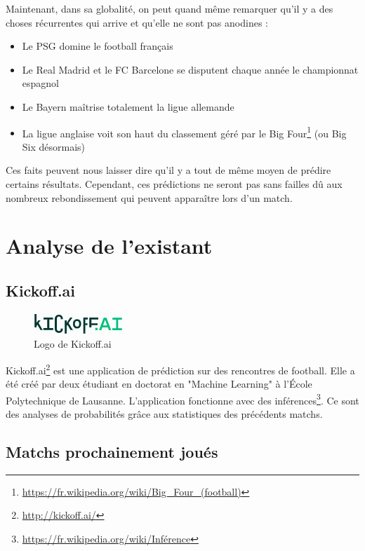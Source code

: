 \documentclass[a4paper,14pt]{extarticle}
\begin{document}
{Maintenant, dans sa globalité, on peut quand même remarquer qu'il y a des choses récurrentes qui arrive et qu'elle ne sont pas anodines :
\begin{itemize}
    \item Le PSG domine le football français
    \item Le Real Madrid et le FC Barcelone se disputent chaque année le championnat espagnol
    \item Le Bayern maîtrise totalement la ligue allemande
    \item La ligue anglaise voit son haut du classement géré par le Big Four\footnote{\url{https://fr.wikipedia.org/wiki/Big_Four_(football)}} (ou Big Six désormais)
\end{itemize}
Ces faits peuvent nous laisser dire qu'il y a tout de même moyen de prédire certains résultats. Cependant, ces prédictions ne seront pas sans failles dû aux nombreux rebondissement qui peuvent apparaître lors d'un match. 

\section{Analyse de l'existant}

\subsection{Kickoff.ai}
\begin{figure}[H]
    \centering
    \includegraphics{../img/kickoffai.png}
    \caption{Logo de Kickoff.ai}
    \label{fig:logoKickoffAI}
\end{figure}

Kickoff.ai\footnote{\url{http://kickoff.ai/}} est une application de prédiction sur des rencontres de football. Elle a été créé par deux étudiant en doctorat en "Machine Learning" à l'École Polytechnique de Lausanne. L'application fonctionne avec des inférences\footnote{\url{https://fr.wikipedia.org/wiki/Inférence}}. Ce sont des analyses de probabilités grâce aux statistiques des précédents matchs. 

\subsection{Matchs prochainement joués}

}
\end{document}
